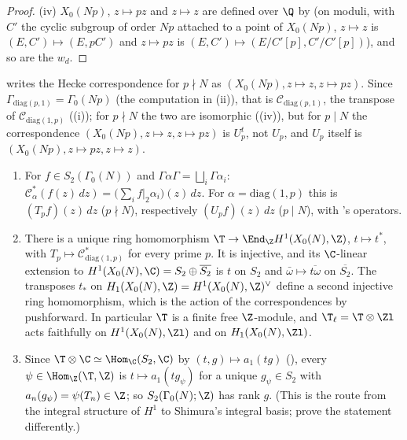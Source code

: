 \begin{proof}
(iv) $X_0(Np)$, $z\mapsto pz$ and $z\mapsto z$ are defined over $\Q$ by  (on moduli, with $C'$ the cyclic subgroup of order $Np$ attached to a point of $X_0(Np)$,
$z\mapsto z$ is $(E,C')\mapsto(E,pC')$ and $z\mapsto pz$ is $(E,C')\mapsto(E/C'[p],C'/C'[p])$), and so are the $w_d$.
\end{proof}

 writes the Hecke correspondence for $p\nmid N$ as $(X_0(Np),z\mapsto z,z\mapsto pz)$. Since $\Gamma_{\mathrm{diag}(p,1)}=\Gamma_0(Np)$ (the computation in (ii)), that is
$\mathcal C_{\mathrm{diag}(p,1)}$, the transpose of $\mathcal C_{\mathrm{diag}(1,p)}$ ((i)); for $p\nmid N$ the two are isomorphic ((iv)), but for $p\mid N$ the correspondence $(X_0(Np),z\mapsto z,z\mapsto pz)$ is
$U_p^t$, not $U_p$, and $U_p$ itself is $(X_0(Np),z\mapsto pz,z\mapsto z)$.

\begin{proposition}\label{prop:moddeg:hecke-compatibility}
\leavevmode
\begin{enumerate}[label=(\roman*)]
\item For $f\in S_2(\Gamma_0(N))$ and $\Gamma\alpha\Gamma=\bigsqcup_i\Gamma\alpha_i$: $\mathcal C_\alpha^*(f(z)\,dz)=\bigl(\sum_if|_2\alpha_i\bigr)(z)\,dz$. For $\alpha=\mathrm{diag}(1,p)$ this is $(T_pf)(z)\,dz$
($p\nmid N$), respectively $(U_pf)(z)\,dz$ ($p\mid N$), with 's operators.
\item There is a unique ring homomorphism $\T\to\End_\Z H^1(X_0(N),\Z)$, $t\mapsto t^*$, with $T_p\mapsto\mathcal C_{\mathrm{diag}(1,p)}^*$ for every prime $p$. It is injective, and its
$\C$-linear extension to $H^1(X_0(N),\C)=S_2\oplus\overline{S_2}$ is $t$ on $S_2$ and $\bar\omega\mapsto\overline{t\omega}$ on $\overline{S_2}$. The transposes $t_*$ on
$H_1(X_0(N),\Z)=H^1(X_0(N),\Z)^\vee$ define a second injective ring homomorphism, which is the action of the correspondences by pushforward. In particular $\T$ is a finite
free $\Z$-module, and $\T_\ell=\T\otimes\Zl$ acts faithfully on $H^1(X_0(N),\Zl)$ and on $H_1(X_0(N),\Zl)$.
\item Since $\T\otimes\C\simeq\Hom_\C(S_2,\C)$ by $(t,g)\mapsto a_1(tg)$ (), every $\psi\in\Hom_\Z(\T,\Z)$ is $t\mapsto a_1(tg_\psi)$ for a unique $g_\psi\in S_2$ with
$a_n(g_\psi)=\psi(T_n)\in\Z$; so $S_2(\Gamma_0(N);\Z)$ has rank $g$. (This is the route from the integral structure of $H^1$ to Shimura's integral basis; 
prove the statement differently.)
\end{enumerate}
\end{proposition}

